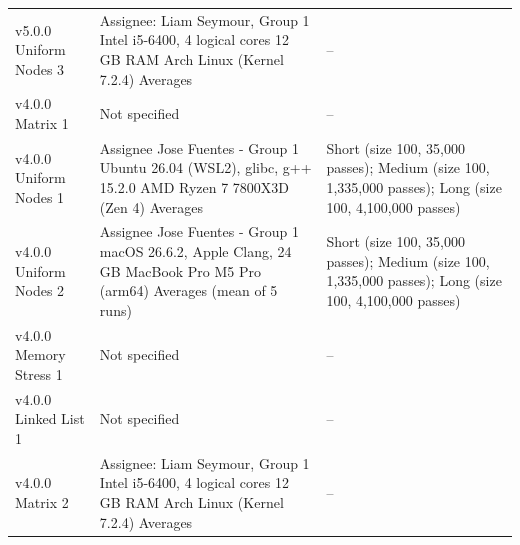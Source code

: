 \begin{longtable}{>{\raggedright\arraybackslash}p{}>{\raggedright\arraybackslash}p{}>{\raggedright\arraybackslash}p{}}
v5.0.0 \textbar{} Uniform Nodes \textbar{} 3 & Assignee: \textbar{}  Liam Seymour, Group 1 \textbar{}  Intel i5-6400, 4 logical cores \textbar{}  12 GB RAM \textbar{}  Arch Linux (Kernel 7.2.4) \textbar{}  Averages & -- \\
v4.0.0 \textbar{} Matrix \textbar{} 1 & Not specified & -- \\
v4.0.0 \textbar{} Uniform Nodes \textbar{} 1 & Assignee \textbar{}  Jose Fuentes - Group 1 \textbar{}  Ubuntu 26.04 (WSL2), glibc, g++ 15.2.0 \textbar{}  AMD Ryzen 7 7800X3D (Zen 4) \textbar{}  Averages & Short  (size 100, 35,000 passes); Medium  (size 100, 1,335,000 passes); Long  (size 100, 4,100,000 passes) \\
v4.0.0 \textbar{} Uniform Nodes \textbar{} 2 & Assignee \textbar{}  Jose Fuentes - Group 1 \textbar{}  macOS 26.6.2, Apple Clang, 24 GB \textbar{}  MacBook Pro M5 Pro (arm64) \textbar{}  Averages (mean of 5 runs) & Short (size 100, 35,000 passes); Medium (size 100, 1,335,000 passes); Long (size 100, 4,100,000 passes) \\
v4.0.0 \textbar{} Memory Stress \textbar{} 1 & Not specified & -- \\
v4.0.0 \textbar{} Linked List \textbar{} 1 & Not specified & -- \\
v4.0.0 \textbar{} Matrix \textbar{} 2 & Assignee: \textbar{}  Liam Seymour, Group 1 \textbar{}  Intel i5-6400, 4 logical cores \textbar{}  12 GB RAM \textbar{}  Arch Linux (Kernel 7.2.4) \textbar{}  Averages & -- \\
\end{longtable}

